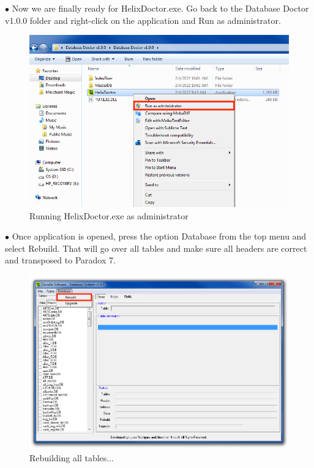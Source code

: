 \documentclass[a4paper, 11pt]{article}
\begin{document}
\pagebreak

\vspace*{\fill}
$\bullet$ Now we are finally ready for HelixDoctor.exe. Go back to the Database Doctor v1.0.0 folder and right-click on the application and Run as administrator.
\begin{figure}[h]
    \centering
     \includegraphics[width=\textwidth]{capture 24}
    \caption{Running HelixDoctor.exe as administrator}
\end{figure}
\vspace*{\fill}

\pagebreak

\vspace*{\fill}
$\bullet$ Once application is opened, press the option Database from the top menu and select Rebuild. That will go over all tables and make sure all headers are correct and transposed to Paradox 7.
\begin{figure}[h]
    \centering
     \includegraphics[width=\textwidth]{capture 25}
    \caption{Rebuilding all tables...}
\end{figure}
\vspace*{\fill}
\end{document}
